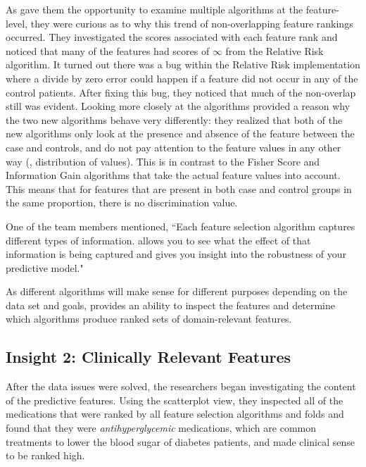 As \infuse gave them the opportunity to
examine multiple algorithms at the feature-level, they were curious as
to why this trend of non-overlapping feature rankings occurred.
They investigated the scores associated with each feature rank
and noticed that many of the features had scores
of $\infty$ from the Relative Risk algorithm.
It turned out there was a bug within the Relative Risk implementation where a
divide by zero error could happen if a feature did not occur
in any of the control patients.  After fixing this bug, they noticed that much of the non-overlap still was evident.  Looking more closely at the algorithms provided a
reason why the two new algorithms behave very differently:  they realized that both of the new algorithms only look at the presence and absence of the feature between the case and controls,
and do not pay attention to the feature values in any other way (\eg, distribution of values).
This is in contrast to the Fisher Score and Information Gain algorithms that take
the actual feature values into account.  This means that for features that are present in both case
and control groups in the same proportion, there is no discrimination value.

One of the team members mentioned, ``Each feature selection algorithm captures different types of information.  \infuse allows you to see what the effect of that information is being captured and gives you insight into the robustness of your predictive model."

As different algorithms will make sense for different purposes depending on the data set and goals, \infuse provides an ability to inspect the features and determine
which algorithms produce ranked sets of domain-relevant features.

\subsection{Insight 2: Clinically Relevant Features}
After the data issues were solved, the researchers began investigating
the content of the predictive features.
Using the scatterplot view,
they inspected all of the medications that were ranked by all
feature selection algorithms and folds and found that they
were \textit{antihyperglycemic} medications, which are common treatments to lower the blood sugar of diabetes patients, and made clinical sense to be ranked high.

